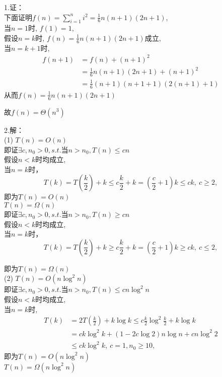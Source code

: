 \documentclass{article}
\begin{document}
1.证：\\
下面证明\(f(n) = \sum_{i = 1}^{n}i^{2} = \frac{1}{6}n(n + 1)(2n + 1)\),\\
当\(n = 1\)时, \(f(1) = 1\),\\
假设\(n = k\)时, \(f(n) = \frac{1}{6}n(n + 1)(2n + 1)\)成立,\\
当\(n = k + 1\)时, \[\begin{aligned}
f(n + 1) & = f(n) + (n + 1)^{2} \\
 & = \frac{1}{6}n(n + 1)(2n + 1) + (n + 1)^{2} \\
 & = \frac{1}{6}(n + 1)(n + 1 + 1)\left( 2(n + 1) + 1 \right)
\end{aligned}\] 从而\(f(n) = \frac{1}{6}n(n + 1)(2n + 1)\)

故\(f(n) = \Theta(n^{3})\)

\hfill\break
2.解：\\
(1) \(T(n) = O(n)\)\\
即证\(\exists c,n_{0} > 0,s.t.当n > n_{0},T(n) \leq cn\)\\

假设\(n < k\)时均成立,\\
当\(n = k\)时，\\
\[T(k) = T\left( \frac{k}{2} \right) + k \leq c\frac{k}{2} + k = \left( \frac{c}{2} + 1 \right)k \leq ck,\ c \geq 2,\]
即为\(T(n) = O(n)\)\\
\(T(n) = \Omega(n)\)\\

即证\(\exists c,n_{0} > 0,s.t.当n > n_{0},T(n) \geq cn\)\\
假设\(n < k\)时均成立,\\
当\(n = k\)时，\\
\[T(k) = T\left( \frac{k}{2} \right) + k \geq c\frac{k}{2} + k = \left( \frac{c}{2} + 1 \right)k \geq ck,\ c \leq 2,\]

即为\(T(n) = \Omega(n)\)\\
(2) \(T(n) = O\left( n\log^{2}n \right)\)\\
即证\(\exists c,n_{0} > 0,s.t.当n > n_{0},T(n) \leq cn\log^{2}n\)\\

假设\(n < k\)时均成立,\\
当\(n = k\)时, \[\begin{aligned}
T(k) & = 2T\left( \frac{k}{2} \right) + k\log k \leq c\frac{k}{2}\log^{2}\frac{k}{2} + k\log k \\
 & = ck\log^{2}k + \left( 1 - 2c\log 2 \right)n\log n + cn\log^{2}2 \\
 & \leq ck\log^{2}k,\ c = 1,n_{0} \geq 10,
\end{aligned}\] 即为\(T(n) = O\left( n\log^{2}n \right)\)\\
\(T(n) = \Omega(n\log^{2}n)\)\\
\end{document}
